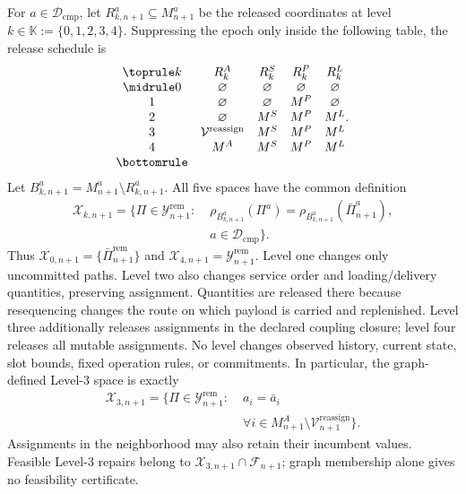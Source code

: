 For $a\in\mathcal D_{\mathrm{cmp}}$, let
$R_{k,n+1}^a\subseteq M_{n+1}^a$ be the released coordinates at level
$k\in\mathbb K:=\{0,1,2,3,4\}$. Suppressing the epoch only inside the
following table, the release schedule is
\begin{equation}
\begin{array}{@{}ccccc@{}}
\toprule
k&R_k^A&R_k^S&R_k^P&R_k^L\\
\midrule
0&\varnothing&\varnothing&\varnothing&\varnothing\\
1&\varnothing&\varnothing&M^P&\varnothing\\
2&\varnothing&M^S&M^P&M^L\\
3&\mathcal V^{\mathrm{reassign}}&M^S&M^P&M^L\\
4&M^A&M^S&M^P&M^L\\
\bottomrule
\end{array}.
\label{eq:release_schedule}
\end{equation}
Let $B_{k,n+1}^a=M_{n+1}^a\setminus R_{k,n+1}^a$. All five spaces have
the common definition
\begin{equation}
\begin{split}
\mathcal X_{k,n+1}=\{\Pi\in\mathcal Y_{n+1}^{\mathrm{rem}}:\;&
\rho_{B_{k,n+1}^a}(\Pi^a)
=\rho_{B_{k,n+1}^a}(\bar\Pi_{n+1}^a),\\
&a\in\mathcal D_{\mathrm{cmp}}\}.
\end{split}
\label{eq:intervention_space}
\end{equation}
Thus $\mathcal X_{0,n+1}=\{\bar\Pi_{n+1}^{\mathrm{rem}}\}$ and
$\mathcal X_{4,n+1}=\mathcal Y_{n+1}^{\mathrm{rem}}$.
Level one changes only uncommitted paths. Level two also changes service
order and loading/delivery quantities, preserving assignment.
Quantities are released there because resequencing changes the route on
which payload is carried and replenished. Level three additionally
releases assignments in the declared coupling closure; level four releases
all mutable assignments. No level changes observed history, current state,
slot bounds, fixed operation rules, or commitments.
In particular, the graph-defined Level-3 space is exactly
\begin{equation}
\begin{split}
\mathcal X_{3,n+1}=\{\Pi\in\mathcal Y_{n+1}^{\mathrm{rem}}:\;&
a_i=\bar a_i\\
&\forall i\in M_{n+1}^A\setminus
\mathcal V_{n+1}^{\mathrm{reassign}}\}.
\end{split}
\label{eq:level_three_space}
\end{equation}
Assignments in the neighborhood may also retain their incumbent values.
Feasible Level-3 repairs belong to
$\mathcal X_{3,n+1}\cap\mathcal F_{n+1}$; graph membership alone gives no
feasibility certificate.

